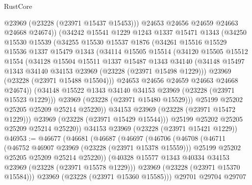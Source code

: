 \begin{lexlean}{RustCore}
\begin{coremodule}
                @23969
                (@23228 (@23971 @15437 @15453)))
              @24653
              @24656
              @24659
              @24663
              @24668
              @24674))
          (@34242
            @15541
            @1229
            @1243
            @1337
            @15471
            @1343
            (@34250
              @15530
              @15539
              (@34255
                @15530
                @15537
                @1876
                (@34261
                  @15516
                  @15529
                  @15536
                  @1337
                  @15479
                  @1343
                  (@34114
                    @15505
                    @15514
                    (@34120
                      @15505
                      @15512
                      @1554
                      (@34128
                        @15504
                        @15511
                        @1337
                        @15487
                        @1343
                        @34140
                        (@34148 @15497 @1343 @34140 @34153 @23969 (@23228 (@23971 @15498 @1229)))
                        @23969
                        (@23228 (@23971 @15488 @15504)))
                      @24653
                      @24656
                      @24659
                      @24663
                      @24668
                      @24674))
                  (@34148 @15522 @1343 @34140 @34153 @23969 (@23228 (@23971 @15523 @1229)))
                  @23969
                  (@23228 (@23971 @15480 @15529)))
                @25199
                @25202
                @25205
                @25209
                @25214
                @25220))
            @34153
            @23969
            (@23228 (@23971 @15472 @1229)))
          @23969
          (@23228 (@23971 @15429 @15544)))
        @25199
        @25202
        @25205
        @25209
        @25214
        @25220))
    @34153
    @23969
    (@23228 (@23971 @15421 @1229))
@46953 := @46677
    (@46681
      (@46687
        (@46697
          (@46706
            (@46708
              (@46711
                (@46752 @46907 @23969 (@23228 (@23971 @15378 @15559)))
                @25199
                @25202
                @25205
                @25209
                @25214
                @25220))
            (@40328 @15577 @1343 @40334 @34153 @23969 (@23228 (@23971 @15578 @1229)))
            @23969
            (@23228 (@23971 @15370 @15584)))
          @23969
          (@23228 (@23971 @15360 @15585)))
        @29701
        @29704
        @29707

\end{coremodule}
\end{lexlean}

